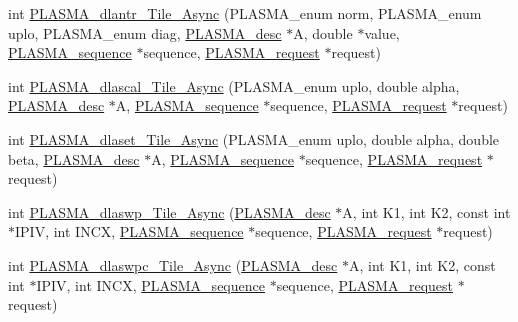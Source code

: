 \begin{DoxyCompactItemize}
\item 
int \hyperlink{group__double__Tile__Async_gad1189684ff2a2fdc1d3b519b4407b058_gad1189684ff2a2fdc1d3b519b4407b058}{P\+L\+A\+S\+M\+A\+\_\+dlantr\+\_\+\+Tile\+\_\+\+Async} (P\+L\+A\+S\+M\+A\+\_\+enum norm, P\+L\+A\+S\+M\+A\+\_\+enum uplo, P\+L\+A\+S\+M\+A\+\_\+enum diag, \hyperlink{structplasma__desc__t}{P\+L\+A\+S\+M\+A\+\_\+desc} $\ast$A, double $\ast$value, \hyperlink{structplasma__sequence__t}{P\+L\+A\+S\+M\+A\+\_\+sequence} $\ast$sequence, \hyperlink{structplasma__request__t}{P\+L\+A\+S\+M\+A\+\_\+request} $\ast$request)
\item 
int \hyperlink{group__double__Tile__Async_ga8ea095a0dc653dd2517c0900c26d254d_ga8ea095a0dc653dd2517c0900c26d254d}{P\+L\+A\+S\+M\+A\+\_\+dlascal\+\_\+\+Tile\+\_\+\+Async} (P\+L\+A\+S\+M\+A\+\_\+enum uplo, double alpha, \hyperlink{structplasma__desc__t}{P\+L\+A\+S\+M\+A\+\_\+desc} $\ast$A, \hyperlink{structplasma__sequence__t}{P\+L\+A\+S\+M\+A\+\_\+sequence} $\ast$sequence, \hyperlink{structplasma__request__t}{P\+L\+A\+S\+M\+A\+\_\+request} $\ast$request)
\item 
int \hyperlink{group__double__Tile__Async_ga2f1fb02013fc9a440a2582b5e15089f5_ga2f1fb02013fc9a440a2582b5e15089f5}{P\+L\+A\+S\+M\+A\+\_\+dlaset\+\_\+\+Tile\+\_\+\+Async} (P\+L\+A\+S\+M\+A\+\_\+enum uplo, double alpha, double beta, \hyperlink{structplasma__desc__t}{P\+L\+A\+S\+M\+A\+\_\+desc} $\ast$A, \hyperlink{structplasma__sequence__t}{P\+L\+A\+S\+M\+A\+\_\+sequence} $\ast$sequence, \hyperlink{structplasma__request__t}{P\+L\+A\+S\+M\+A\+\_\+request} $\ast$request)
\item 
int \hyperlink{group__double__Tile__Async_ga26c0fe8c686d89a1833f7a222fc8cb5b_ga26c0fe8c686d89a1833f7a222fc8cb5b}{P\+L\+A\+S\+M\+A\+\_\+dlaswp\+\_\+\+Tile\+\_\+\+Async} (\hyperlink{structplasma__desc__t}{P\+L\+A\+S\+M\+A\+\_\+desc} $\ast$A, int K1, int K2, const int $\ast$I\+P\+I\+V, int I\+N\+C\+X, \hyperlink{structplasma__sequence__t}{P\+L\+A\+S\+M\+A\+\_\+sequence} $\ast$sequence, \hyperlink{structplasma__request__t}{P\+L\+A\+S\+M\+A\+\_\+request} $\ast$request)
\item 
int \hyperlink{group__double__Tile__Async_ga9cfab9ec348f1e8c64cd41b64f791da0_ga9cfab9ec348f1e8c64cd41b64f791da0}{P\+L\+A\+S\+M\+A\+\_\+dlaswpc\+\_\+\+Tile\+\_\+\+Async} (\hyperlink{structplasma__desc__t}{P\+L\+A\+S\+M\+A\+\_\+desc} $\ast$A, int K1, int K2, const int $\ast$I\+P\+I\+V, int I\+N\+C\+X, \hyperlink{structplasma__sequence__t}{P\+L\+A\+S\+M\+A\+\_\+sequence} $\ast$sequence, \hyperlink{structplasma__request__t}{P\+L\+A\+S\+M\+A\+\_\+request} $\ast$request)

\end{DoxyCompactItemize}

